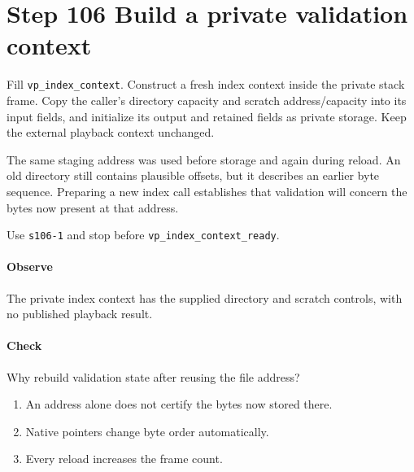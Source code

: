 \section{Step 106 Build a private validation context}
Fill \texttt{vp\_index\_context}. Construct a fresh index context inside the private stack frame. Copy the caller's directory capacity and scratch address/capacity into its input fields, and initialize its output and retained fields as private storage. Keep the external playback context unchanged.

The same staging address was used before storage and again during reload. An old directory still contains plausible offsets, but it describes an earlier byte sequence. Preparing a new index call establishes that validation will concern the bytes now present at that address.

Use \texttt{s106-1} and stop before \texttt{vp\_index\_context\_ready}.

\paragraph{Observe} The private index context has the supplied directory and scratch controls, with no published playback result.

\paragraph{Check} Why rebuild validation state after reusing the file address?
\begin{enumerate}[label=\Alph*.]
\item An address alone does not certify the bytes now stored there.
\item Native pointers change byte order automatically.
\item Every reload increases the frame count.
\end{enumerate}
